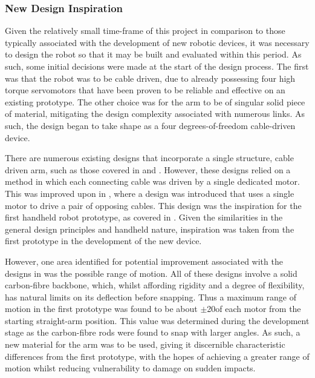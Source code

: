 \documentclass[11pt]{article}
\begin{document}
\subsubsection{New Design Inspiration}
\label{section:newDesignInspiration}
Given the relatively small time-frame of this project in comparison to those typically associated with the development of new robotic devices, it was necessary to design the robot so that it may be built and evaluated within this period. As such, some initial decisions were made at the start of the design process. The first was that the robot was to be cable driven, due to already possessing four high torque servomotors that have been proven to be reliable and effective on an existing prototype. The other choice was for the arm to be of singular solid piece of material, mitigating the design complexity associated with numerous links. As such, the design began to take shape as a four degrees-of-freedom cable-driven device. 

There are numerous existing designs that incorporate a single structure, cable driven arm, such as those covered in \cite{godage2011} and \cite{zhang2011}. However, these designs relied on a method in which each connecting cable was driven by a single dedicated motor. This was improved upon in \cite{yoon2009}, where a design was introduced that uses a single motor to drive a pair of opposing cables. This design was the inspiration for the first handheld robot prototype, as covered in \cite{GreggSmithDesign}. Given the similarities in the general design principles and handheld nature, inspiration was taken from the first prototype in the development of the new device.

However, one area identified for potential improvement associated with the designs in \cite{godage2011}\cite{zhang2011}\cite{GreggSmithDesign} was the possible range of motion. All of these designs involve a solid carbon-fibre backbone, which, whilst affording rigidity and a degree of flexibility, has natural limits on its deflection before snapping. Thus a maximum range of motion in the first prototype was found to be about $\pm$20\degree of each motor from the starting straight-arm position. This value was determined during the development stage as the carbon-fibre rods were found to snap with larger angles. As such, a new material for the arm was to be used, giving it discernible characteristic differences from the first prototype, with the hopes of achieving a greater range of motion whilst reducing vulnerability to damage on sudden impacts.
\end{document}
